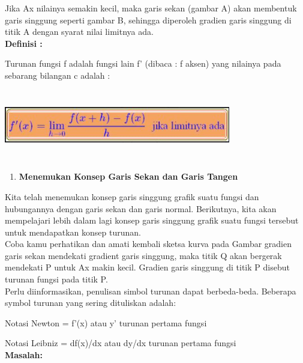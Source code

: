 \documentclass[11pt,fleqn]{book} %
\begin{document}
\noindent 
Jika Ax nilainya semakin kecil, maka garis sekan (gambar A) akan membentuk garis singgung seperti gambar B, sehingga diperoleh gradien garis singgung di titik A dengan syarat nilai limitnya ada.\\


\noindent 
\textbf{Definisi :}

\noindent 
Turunan fungsi f adalah fungsi lain f’ (dibaca : f aksen)  yang nilainya pada sebarang bilangan c adalah :

\noindent 
\begin{center}
\noindent \includegraphics*[width=3.90in, height=1.21in, keepaspectratio=false, trim=0.00in 0.11in 0.00in 0.00in]{Pictures/TurunanFungsi5.JPG}
\end{center}

\noindent 
\begin{enumerate}
\item \textbf{Menemukan Konsep Garis Sekan dan Garis Tangen}
\end{enumerate}

\noindent 
Kita telah menemukan konsep garis singgung grafik suatu fungsi dan hubungannya dengan garis sekan dan garis normal. Berikutnya, kita akan mempelajari lebih dalam lagi konsep garis singgung grafik suatu fungsi tersebut untuk mendapatkan konsep turunan.\\

\noindent 
Coba kamu perhatikan dan amati kembali sketsa kurva pada Gambar gradien garis sekan mendekati gradient garis singgung, maka titik Q akan bergerak mendekati P untuk Ax makin kecil. Gradien garis singgung di titik P disebut turunan fungsi pada titik P.\\

\noindent 
Perlu diinformasikan, penulisan simbol turunan dapat berbeda-beda. Beberapa symbol turunan yang sering dituliskan adalah:

\noindent 
Notasi Newton = f'(x)  atau  y'  turunan pertama fungsi

\noindent 
Notasi Leibniz = df(x)/dx  atau  dy/dx  turunan pertama fungsi\\

\noindent 
\textbf{Masalah:}
\end{document}
